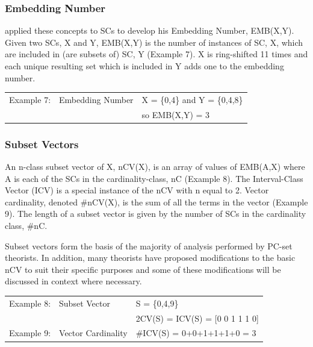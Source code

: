 \documentclass{article}
\begin{document}
\subsubsection{Embedding Number}
\label{sec-3-3-2}

\citet{Lewin1979} applied these concepts to SCs to develop his
Embedding Number, EMB(X,Y). Given two SCs, X and Y, EMB(X,Y) is the
number of instances of SC, X, which are included in (are subsets of)
SC, Y (Example 7). X is ring-shifted 11 times and each unique
resulting set which is included in Y adds one to the embedding number.

\begin{center}
\begin{tabular}{lll}
 Example 7:  &  Embedding Number  &  X = \{0,4\} and Y = \{0,4,8\}  \\
             &                    &  so EMB(X,Y) = 3                \\
\end{tabular}
\end{center}
\subsubsection{Subset Vectors}
\label{sec-3-3-3}

An n-class subset vector of X, nCV(X), is an array of values of
EMB(A,X) where A is each of the SCs in the cardinality-class, nC
(Example 8). The Interval-Class Vector (ICV) is a special instance of
the nCV with n equal to 2. Vector cardinality, denoted \#nCV(X), is the
sum of all the terms in the vector (Example 9). The length of a subset
vector is given by the number of SCs in the cardinality class, \#nC.

Subset vectors form the basis of the majority of analysis performed
by PC-set theorists. In addition, many theorists have proposed
modifications to the basic nCV to suit their specific purposes and
some of these modifications will be discussed in context where
necessary.


\begin{center}
\begin{tabular}{lll}
 Example 8:  &  Subset Vector       &  S = \{0,4,9\}                    \\
             &                      &  2CV(S) = ICV(S) = [0 0 1 1 1 0]  \\
 Example 9:  &  Vector Cardinality  &  \#ICV(S) = 0+0+1+1+1+0 = 3       \\
\end{tabular}
\end{center}
\end{document}
